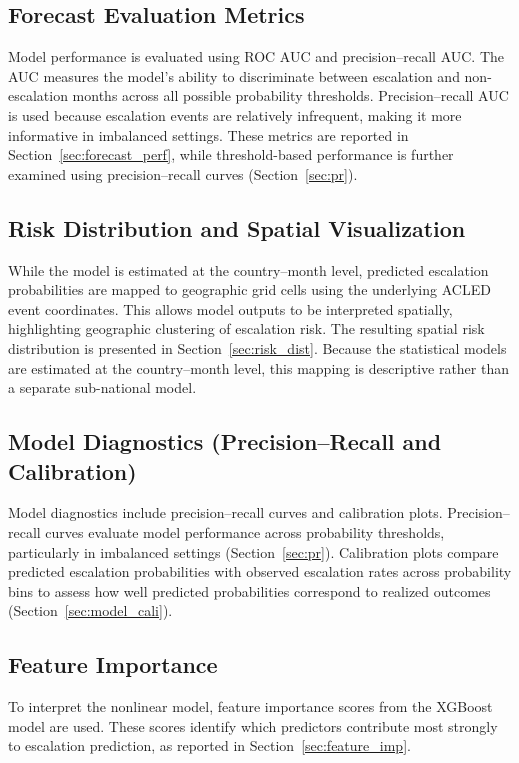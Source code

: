 \documentclass[12pt]{article}
\begin{document}
\subsection{Forecast Evaluation Metrics}

Model performance is evaluated using ROC AUC and precision--recall AUC. The AUC measures the model’s ability to discriminate between escalation and non-escalation months across all possible probability thresholds. Precision--recall AUC is used because escalation events are relatively infrequent, making it more informative in imbalanced settings. These metrics are reported in Section~\ref{sec:forecast_perf}, while threshold-based performance is further examined using precision--recall curves (Section~\ref{sec:pr}).

\subsection{Risk Distribution and Spatial Visualization}

While the model is estimated at the country--month level, predicted escalation probabilities are mapped to geographic grid cells using the underlying ACLED event coordinates. This allows model outputs to be interpreted spatially, highlighting geographic clustering of escalation risk. The resulting spatial risk distribution is presented in Section~\ref{sec:risk_dist}. Because the statistical models are estimated at the country--month level, this mapping is descriptive rather than a separate sub-national model.

\subsection{Model Diagnostics (Precision--Recall and Calibration)}

Model diagnostics include precision--recall curves and calibration plots. Precision--recall curves evaluate model performance across probability thresholds, particularly in imbalanced settings (Section~\ref{sec:pr}). Calibration plots compare predicted escalation probabilities with observed escalation rates across probability bins to assess how well predicted probabilities correspond to realized outcomes (Section~\ref{sec:model_cali}).

\subsection{Feature Importance}

To interpret the nonlinear model, feature importance scores from the XGBoost model are used. These scores identify which predictors contribute most strongly to escalation prediction, as reported in Section~\ref{sec:feature_imp}.
\end{document}
